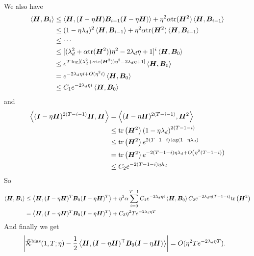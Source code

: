 \begin{enumerate}[leftmargin=*]
        We also have
        \begin{align*}
            \left\langle {\bm{H}},{\bm{B}}_i\right\rangle&\leq\left\langle {\bm{H}},({\bm{I}}-\eta{\bm{H}}){\bm{B}}_{i-1}({\bm{I}}-\eta{\bm{H}})\right\rangle+\eta^2\alpha\text{tr}({\bm{H}}^2)\left\langle {\bm{H}},{\bm{B}}_{i-1}\right\rangle \\
            &\leq(1-\eta\lambda_d)^2\left\langle {\bm{H}},{\bm{B}}_{i-1}\right\rangle+\eta^2\alpha\text{tr}({\bm{H}}^2)\left\langle {\bm{H}},{\bm{B}}_{i-1}\right\rangle \\
            &\leq \cdots \\
            &\leq [(\lambda_d^2+\alpha\text{tr}({\bm{H}}^2))\eta^2-2\lambda_d\eta+1]^{i}\left\langle {\bm{H}},{\bm{B}}_0\right\rangle \\
            &\leq e^{T\log[(\lambda_d^2+\alpha\text{tr}({\bm{H}}^2))\eta^2-2\lambda_d\eta+1]}\left\langle {\bm{H}},{\bm{B}}_0\right\rangle \\
            &=e^{-2\lambda_d\eta i+O(\eta^2i)}\left\langle {\bm{H}},{\bm{B}}_0\right\rangle\\
            &\leq C_1e^{-2\lambda_d\eta i}\left\langle {\bm{H}},{\bm{B}}_0\right\rangle
        \end{align*}
        and
        \begin{align*}
            \left\langle ({\bm{I}}-\eta{\bm{H}})^{2(T-i-1)}{\bm{H}},{\bm{H}}\right\rangle&=\left\langle ({\bm{I}}-\eta{\bm{H}})^{2(T-i-1)},{\bm{H}}^2\right\rangle \\
            &\leq \mathrm{tr}\left({\bm{H}}^2\right)\left(1-\eta\lambda_d\right)^{2(T-1-i)} \\
            &\leq \mathrm{tr}\left({\bm{H}}^2\right)e^{2(T-1-i)\log \left(1-\eta\lambda_d\right)} \\
            &=\mathrm{tr}\left({\bm{H}}^2\right)e^{-2(T-1-i)\eta\lambda_d+O\left(\eta^2(T-1-i)\right)} \\
            &\leq C_2e^{-2(T-1-i)\eta\lambda_d}
        \end{align*}
        So
        \begin{align*}
            \left\langle {\bm{H}},{\bm{B}}_i\right\rangle&\leq \left\langle {\bm{H}},({\bm{I}}-\eta{\bm{H}})^{T}{\bm{B}}_0({\bm{I}}-\eta{\bm{H}})^{T}\right\rangle+\eta^2\alpha\sum_{i=0}^{T-1}C_1e^{-2\lambda_d\eta i}\left\langle {\bm{H}},{\bm{B}}_0\right\rangle C_2e^{-2\lambda_d\eta(T-1-i)}\mathrm{tr}\left({\bm{H}}^2\right) \\
            &=\left\langle {\bm{H}},({\bm{I}}-\eta{\bm{H}})^{T}{\bm{B}}_0({\bm{I}}-\eta{\bm{H}})^{T}\right\rangle+C_3\eta^2Te^{-2\lambda_d\eta T}
        \end{align*}
        And finally we get
        \begin{align*}
            &\left|\bar{\mathcal{R}}^{\mathrm{bias}}(1,T;\eta)-\frac{1}{2}\left\langle {\bm{H}},({\bm{I}}-\eta{\bm{H}})^{\top}{\bm{B}}_0({\bm{I}}-\eta{\bm{H}})\right\rangle\right|= O(\eta^2 Te^{-2\lambda_d\eta T}).
        \end{align*}


\end{enumerate}
